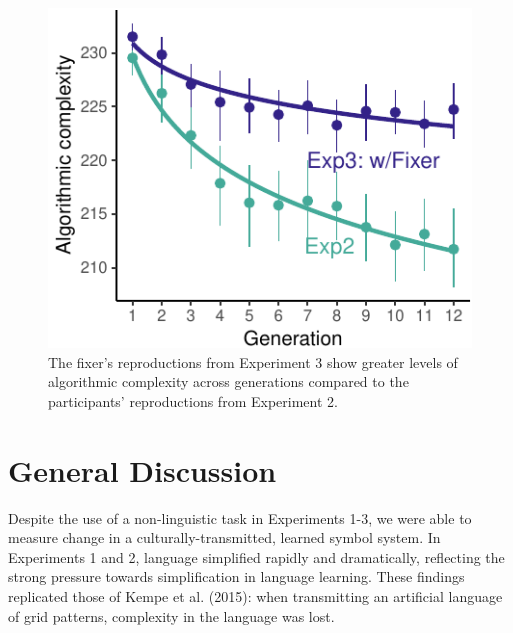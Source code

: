 \documentclass[10pt, letterpaper]{article}
\newenvironment{CodeChunk}{}{}
\begin{document}
\begin{CodeChunk}
\begin{figure}[tb]

{\centering \includegraphics{figs/both_complexity-1} 

}

\caption[The fixer's reproductions from Experiment 3 show greater levels of algorithmic complexity across generations compared to the participants' reproductions from Experiment 2]{The fixer's reproductions from Experiment 3 show greater levels of algorithmic complexity across generations compared to the participants' reproductions from Experiment 2.}\label{fig:both_complexity}
\end{figure}
\end{CodeChunk}

\section{General Discussion}\label{general-discussion}

Despite the use of a non-linguistic task in Experiments 1-3, we were
able to measure change in a culturally-transmitted, learned symbol
system. In Experiments 1 and 2, language simplified rapidly and
dramatically, reflecting the strong pressure towards simplification in
language learning. These findings replicated those of Kempe et al.
(2015): when transmitting an artificial language of grid patterns,
complexity in the language was lost.
\end{document}
